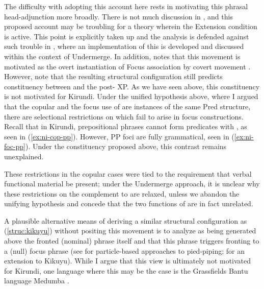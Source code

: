 \documentclass[12pt]{article}
\begin{document}
The difficulty with adopting this account here rests in motivating this phrasal head-adjunction more broadly. There is not much discussion in \citet{fschwarz-2003}, and this proposed account may be troubling for a theory wherein the Extension condition is active. This point is explicitly taken up and the analysis is defended against such trouble in \citet{yuan-2017,yuan-2017gen}, where an implementation of this is developed and discussed within the context of Undermerge. In addition, \citeauthor{yuan-2017gen} notes that this movement is motivated as the overt instantiation of Focus association by covert movement \citep{wagner-2006,erlewine-kotek-2018}. However, note that the resulting structural configuration still predicts constituency between  and the post- XP. As we have seen above, this constituency is not motivated for Kirundi. Under the unified hypothesis above, where I argued that  the copular and the focus use of  are instances of the same Pred structure, there are selectional restrictions on  which fail to arise in focus constructions. Recall that in Kirundi, prepositional phrases cannot form predicates with , as seen in (\ref{ex:ni-cop-pp}). However, PP foci are fully grammatical, seen in (\ref{ex:ni-foc-pp}). Under the constituency proposed above, this contrast remains unexplained. 

\bex
\ex\bxl
{} \label{ex:ni-cop-pp}
 \label{ex:ni-foc-pp} %
\fxl
\fex

These restrictions in the copular cases were tied to the requirement that verbal functional material be present; under the Undermerge approach, it is unclear why these restrictions on the complement to  are relaxed, unless we abandon the unifying hypothesis and concede that the two functions of  are in fact unrelated.

A plausible alternative means of deriving a similar structural configuration as (\ref{struc:kikuyu}) without positing this movement is to analyze  as being generated above the fronted (nominal) phrase itself and that this phrase triggers fronting to a (null) focus phrase (see \citealt{cable-2007,cable-2010,branan-erlewine-2022} for particle-based approaches to pied-piping; \citealt{yuan-2017,yuan-2017gen} for an extension to Kikuyu). While I argue that this view is ultimately not motivated for Kirundi, one language where this may be the case is the Grassfields Bantu language Medumba \citep{keupdjio-2020}. %
\end{document}
